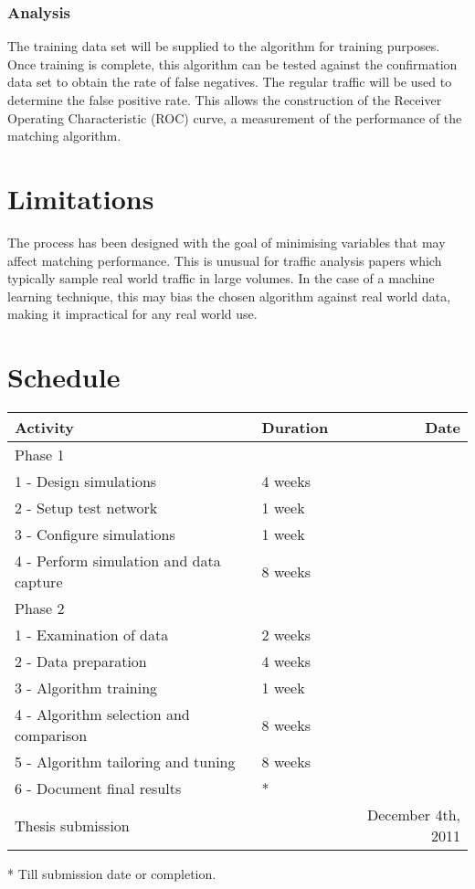 \documentclass{ecuthesis}
\begin{document}
\subsubsection{Analysis}

The training data set will be supplied to the algorithm for training purposes.
Once training is complete, this algorithm can be tested against the
confirmation data set to obtain the rate of false negatives. The regular
traffic will be used to determine the false positive rate. This allows the
construction of the Receiver Operating Characteristic (ROC) curve, a
measurement of the performance of the matching algorithm.

\section{Limitations}

The process has been designed with the goal of minimising variables that may
affect matching performance. This is unusual for traffic analysis papers which
typically sample real world traffic in large volumes. In the case of a machine
learning technique, this may bias the chosen algorithm against real world data,
making it impractical for any real world use.

\section{Schedule}

\begin{tabular}{llr}
  \toprule
  Activity & Duration & Date \\
  \midrule
  Phase 1 \\
  1 - Design simulations & 4 weeks \\
  2 - Setup test network & 1 week \\
  3 - Configure simulations & 1 week \\
  4 - Perform simulation and data capture & 8 weeks \\
  Phase 2 \\
  1 - Examination of data & 2 weeks \\
  2 - Data preparation & 4 weeks \\
  3 - Algorithm training & 1 week \\
  4 - Algorithm selection and comparison & 8 weeks \\
  5 - Algorithm tailoring and tuning & 8 weeks \\
  6 - Document final results & * \\
  \midrule
  Thesis submission & & December 4th, 2011 \\
  \bottomrule
\end{tabular}

* Till submission date or completion.

\printbibliography[title=REFERENCES]
\end{document}
